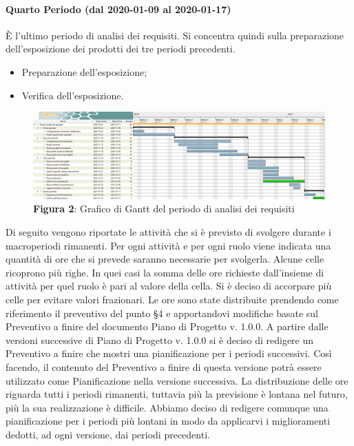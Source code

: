 \paragraph{Quarto Periodo (dal 2020-01-09 al 2020-01-17)}
È l'ultimo periodo di analisi dei requisiti. Si concentra quindi sulla preparazione dell'esposizione dei prodotti dei tre periodi precedenti.
\begin{itemize}
	\item Preparazione dell'esposizione;
	\item Verifica dell'esposizione.
\end{itemize}


\begin{landscape}
	\begin{figure}[H]
		\centering
		\includegraphics[width=\linewidth]{res/images/ganttFase1.png}
		\caption*{\textbf{Figura 2}{: Grafico di Gantt del periodo di analisi dei requisiti}}
		\label{fig:Gantt Analisi dei requisiti}
	\end{figure}
\end{landscape}



\noindent Di seguito vengono riportate le attività che si è previsto di svolgere durante i macroperiodi rimanenti. Per ogni attività e per ogni ruolo viene indicata una quantità di ore che si prevede saranno necessarie per svolgerla. Alcune celle ricoprono più righe. In quei casi la somma delle ore richieste dall'insieme di attività per quel ruolo è pari al valore della cella. Si è deciso di accorpare più celle per evitare valori frazionari. \newline
\indent Le ore sono state distribuite prendendo come riferimento il preventivo del punto §4 e apportandovi modifiche basate sul Preventivo a finire del documento Piano di Progetto v. 1.0.0. A partire dalle versioni successive di Piano di Progetto v. 1.0.0 si è deciso di redigere un Preventivo a finire che mostri una pianificazione per i periodi successivi. Così facendo, il contenuto del Preventivo a finire di questa versione potrà essere utilizzato come Pianificazione nella versione successiva. \newline
\indent La distribuzione delle ore riguarda tutti i periodi rimanenti, tuttavia più la previsione è lontana nel futuro, più la sua realizzazione è difficile. Abbiamo deciso di redigere comunque una pianificazione per i periodi più lontani in modo da applicarvi i miglioramenti dedotti, ad ogni versione, dai periodi precedenti. \newline

